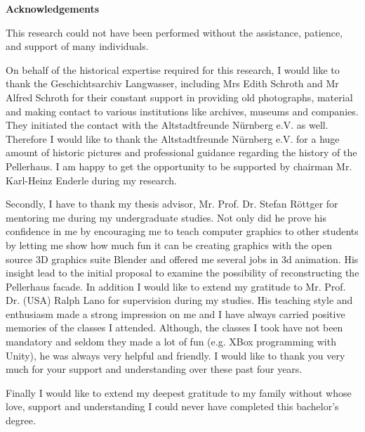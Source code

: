 \thispagestyle{plain}
\begin{center}
	
	\LARGE
	
	\textbf{Acknowledgements}
	
\end{center}

This research could not have been performed without the assistance, patience, and support of many individuals.

On behalf of the historical expertise required for this research, I would like to thank the Geschichtsarchiv Langwasser, including Mrs Edith Schroth and Mr Alfred Schroth for their constant support in providing old photographs, material and making contact to various institutions like archives, museums and companies. They initiated the contact with the Altstadtfreunde Nürnberg e.V. as well.
Therefore I would like to thank the Altstadtfreunde Nürnberg e.V. for a huge amount of historic pictures and professional guidance regarding the history of the Pellerhaus. I am happy to get the opportunity to be supported by chairman Mr. Karl-Heinz Enderle during my research.

Secondly, I have to thank my thesis advisor, Mr. Prof. Dr. Stefan Röttger for mentoring me during my undergraduate studies. Not only did he prove his confidence in me by encouraging me to teach computer graphics to other students by letting me show how much fun it can be creating graphics with the open source 3D graphics suite Blender and offered me several jobs in 3d animation. His insight lead to the initial proposal to examine the possibility of reconstructing the Pellerhaus facade. In addition I would like to extend my gratitude to Mr. Prof. Dr. (USA) Ralph Lano for supervision during my studies. His teaching style and enthusiasm made a strong impression on me and I have always carried positive memories of the classes I attended. Although, the classes I took have not been mandatory and seldom they made a lot of fun (e.g. XBox programming with Unity), he was always very helpful and friendly. I would like to thank you very much for your support and understanding over these past four years.

Finally I would like to extend my deepest gratitude to my family without whose love, support and understanding I could never have completed this bachelor's degree.


\pagebreak